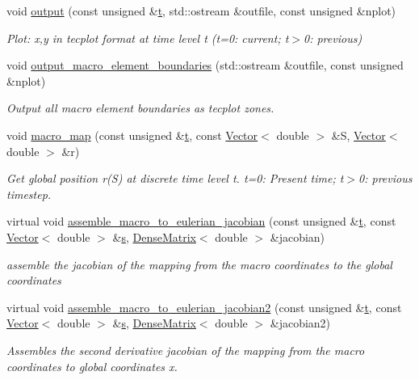 \begin{DoxyCompactItemize}
void \hyperlink{classoomph_1_1QMacroElement_3_012_01_4_a1fe56200453a2200e5103d3fb4793e38}{output} (const unsigned \&\hyperlink{cfortran_8h_af6f0bd3dc13317f895c91323c25c2b8f}{t}, std\+::ostream \&outfile, const unsigned \&nplot)
\begin{DoxyCompactList}\small\item\em Plot\+: x,y in tecplot format at time level t (t=0\+: current; t$>$0\+: previous) \end{DoxyCompactList}\item 
void \hyperlink{classoomph_1_1QMacroElement_3_012_01_4_ae717a0b0098f830a1b1a5019ce5431a8}{output\+\_\+macro\+\_\+element\+\_\+boundaries} (std\+::ostream \&outfile, const unsigned \&nplot)
\begin{DoxyCompactList}\small\item\em Output all macro element boundaries as tecplot zones. \end{DoxyCompactList}\item 
void \hyperlink{classoomph_1_1QMacroElement_3_012_01_4_af78c96d14b561af4ee3b1bf6c5331766}{macro\+\_\+map} (const unsigned \&\hyperlink{cfortran_8h_af6f0bd3dc13317f895c91323c25c2b8f}{t}, const \hyperlink{classoomph_1_1Vector}{Vector}$<$ double $>$ \&S, \hyperlink{classoomph_1_1Vector}{Vector}$<$ double $>$ \&r)
\begin{DoxyCompactList}\small\item\em Get global position r(\+S) at discrete time level t. t=0\+: Present time; t$>$0\+: previous timestep. \end{DoxyCompactList}\item 
virtual void \hyperlink{classoomph_1_1QMacroElement_3_012_01_4_a74aaa1b631144e956b5f61e8d0cd9f05}{assemble\+\_\+macro\+\_\+to\+\_\+eulerian\+\_\+jacobian} (const unsigned \&\hyperlink{cfortran_8h_af6f0bd3dc13317f895c91323c25c2b8f}{t}, const \hyperlink{classoomph_1_1Vector}{Vector}$<$ double $>$ \&\hyperlink{cfortran_8h_ab7123126e4885ef647dd9c6e3807a21c}{s}, \hyperlink{classoomph_1_1DenseMatrix}{Dense\+Matrix}$<$ double $>$ \&jacobian)
\begin{DoxyCompactList}\small\item\em assemble the jacobian of the mapping from the macro coordinates to the global coordinates \end{DoxyCompactList}\item 
virtual void \hyperlink{classoomph_1_1QMacroElement_3_012_01_4_aef266683860031114776d25f51e8e306}{assemble\+\_\+macro\+\_\+to\+\_\+eulerian\+\_\+jacobian2} (const unsigned \&\hyperlink{cfortran_8h_af6f0bd3dc13317f895c91323c25c2b8f}{t}, const \hyperlink{classoomph_1_1Vector}{Vector}$<$ double $>$ \&\hyperlink{cfortran_8h_ab7123126e4885ef647dd9c6e3807a21c}{s}, \hyperlink{classoomph_1_1DenseMatrix}{Dense\+Matrix}$<$ double $>$ \&jacobian2)
\begin{DoxyCompactList}\small\item\em Assembles the second derivative jacobian of the mapping from the macro coordinates to global coordinates x. \end{DoxyCompactList}\end{DoxyCompactItemize}
